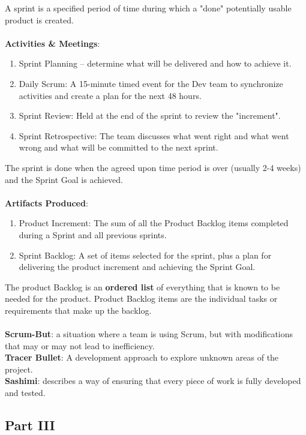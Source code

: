 \documentclass{article}
\begin{document}
A sprint is a specified period of time during which a "done" potentially usable product is created.\\\\
\textbf{Activities \& Meetings}:
\begin{enumerate}
    \item Sprint Planning -- determine what will be delivered and how to achieve it. 
    \item Daily Scrum: A 15-minute timed event for the Dev team to synchronize activities and create a plan for the next 48 hours.
    \item Sprint Review: Held at the end of the sprint to review the "increment".
    \item Sprint Retrospective: The team discusses what went right and what went wrong and what will be committed to the next sprint. 
\end{enumerate}

The sprint is done when the agreed upon time period is over (usually 2-4 weeks) and the Sprint Goal is achieved. 
\\\\
\textbf{Artifacts Produced}:
\begin{enumerate}
    \item Product Increment: The sum of all the Product Backlog items completed during a Sprint and all previous sprints.
    \item Sprint Backlog: A set of items selected for the sprint, plus a plan for delivering the product increment and achieving the Sprint Goal. 
\end{enumerate}

The product Backlog is an \textbf{ordered list} of everything that is known to be needed for the product. Product Backlog items are the individual tasks or requirements that make up the backlog.
\\\\
\textbf{Scrum-But}: a situation where a team is using Scrum, but with modifications that may or may not lead to inefficiency.
\\\textbf{Tracer Bullet}: A development approach to explore unknown areas of the project.
\\\textbf{Sashimi}: describes a way of ensuring that every piece of work is fully developed and tested.

\subsection*{Part III}
\end{document}
